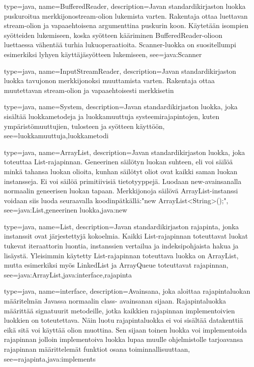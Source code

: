 {
	type=java,
	name=BufferedReader,
	description={Javan standardikirjaston luokka puskuroitua merkkijonostream-olion lukemista
varten. Rakentaja ottaa luettavan stream-olion ja vapaaehtoisena argumenttina puskurin koon.
Käytetään isompien syötteiden lukemiseen, koska syötteen kääriminen BufferedReader-olioon
luettaessa vähentää turhia lukuoperaatioita. Scanner-luokka on suositellumpi esimerkiksi
lyhyen käyttäjäsyötteen lukemiseen},
	see=java:Scanner
}

{
	type=java,
	name=InputStreamReader,
	description={Javan standardikirjaston luokka tavujonon merkkijonoksi muuttamista varten.
Rakentaja ottaa muutettavan stream-olion ja vapaaehtoisesti merkkisetin}
}

{
	type=java,
	name=System,
	description={Javan standardikirjaston luokka, joka sisältää luokkametodeja ja luokkamuuttuja
systeemirajapintojen, kuten ympäristömuuttujien, tulosteen ja syötteen käyttöön},
	see={luokkamuuttuja,luokkametodi}
}

{
	type=java,
	name=ArrayList,
	description={Javan standardikirjaston luokka, joka toteuttaa List-rajapinnan. Geneerinen
säilötyn luokan suhteen, eli voi säilöä minkä tahansa luokan olioita, kunhan säilötyt oliot ovat
kaikki saman luokan instansseja. Ei voi säilöä primitiivisiä tietotyyppejä. Luodaan
new-avainsanalla  normaalin geneerisen luokan tapaan. Merkkijonoja säilövä ArrayList-instanssi
voidaan siis luoda seuraavalla koodinpätkällä:\newline{}"new ArrayList<String>();"},
	see={java:List,geneerinen luokka,java:new}
}

{
	type=java,
	name=List,
	description={Javan standardikirjaston rajapinta, jonka instanssit ovat järjestettyjä
kokoelmia. Kaikki List-rajapinnan toteuttavat luokat tukevat iteraattorin luontia, instanssien
vertailua ja indeksipohjaista hakua ja lisäystä. Yleisimmin käytetty List-rajapinnan toteuttava
luokka on ArrayList, mutta esimerkiksi myös LinkedList ja ArrayQueue toteuttavat rajapinnan},
	see={java:ArrayList,java:interface,rajapinta}
}

{
	type=java,
	name=interface,
	description={Avainsana, joka aloittaa rajapintaluokan määritelmän Javassa normaalin class-
avainsanan sijaan. Rajapintaluokka määrittää signatuurit metodeille, jotka kaikkien rajapinnan
implementoivien luokkien on toteutettava. Näin luotu rajapintaluokka ei voi sisältää datakenttiä
eikä sitä voi käyttää olion muottina. Sen sijaan toinen luokka voi implementoida rajapinnan
jolloin implementoiva luokka lupaa muulle ohjelmistolle tarjoavansa rajapinnan määrittelemät
funktiot osana toiminnallisuuttaan},
	see={rajapinta,java:implements}
}

